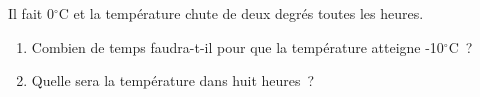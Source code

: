 \documentclass[exercice]{thedocument}%
\begin{document}
%
Il fait 0$^\circ$C et la température chute de deux degrés toutes les heures.
\begin{enumerate}
    \item Combien de temps faudra-t-il pour que la température atteigne
    -10$^\circ$C~?
    \item Quelle sera la température dans huit heures~?
\end{enumerate}
\end{document}
